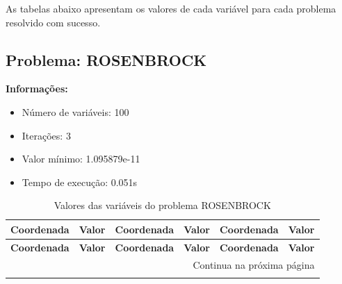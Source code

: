 \documentclass[12pt]{article}
\begin{document}
As tabelas abaixo apresentam os valores de cada variável para cada problema resolvido com sucesso.


\newpage            
\subsection{Problema: ROSENBROCK}

\textbf{Informações:}
\begin{itemize}
\item Número de variáveis: 100
\item Iterações: 3
\item Valor mínimo: 1.095879e-11
\item Tempo de execução: 0.051s
\end{itemize}

\small
\begin{longtable}{@{}cc|cc|cc@{}}
\caption{Valores das variáveis do problema ROSENBROCK} \\
\toprule
\textbf{Coordenada} & \textbf{Valor} & \textbf{Coordenada} & \textbf{Valor} & \textbf{Coordenada} & \textbf{Valor} \\
\midrule
\endfirsthead

\toprule
\textbf{Coordenada} & \textbf{Valor} & \textbf{Coordenada} & \textbf{Valor} & \textbf{Coordenada} & \textbf{Valor} \\
\midrule
\endhead

\midrule \multicolumn{6}{r}{{Continua na próxima página}} \\ \midrule
\endfoot


\end{longtable}
\end{document}
